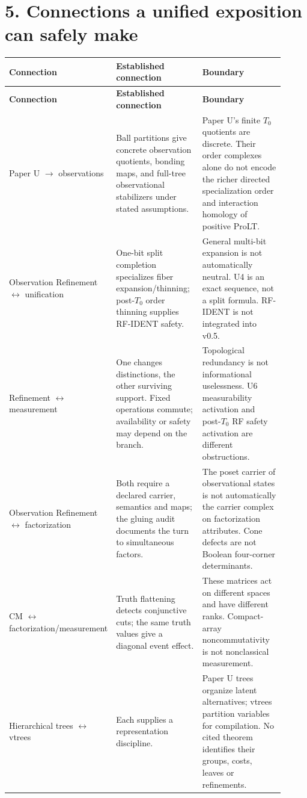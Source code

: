 \documentclass[10pt,letterpaper]{article}
\begin{document}
\section*{5. Connections a unified exposition can safely make}

\begingroup
\footnotesize
\setlength{\tabcolsep}{4pt}
\renewcommand{\arraystretch}{1.12}
\begin{longtable}{@{}P{0.210\linewidth}P{0.348\linewidth}P{0.348\linewidth}@{}}
\hline
\textbf{Connection} & \textbf{Established connection} & \textbf{Boundary} \\ \hline
\endfirsthead
\hline
\textbf{Connection} & \textbf{Established connection} & \textbf{Boundary} \\ \hline
\endhead
Paper U \ensuremath{\to} observations & Ball partitions give concrete observation quotients, bonding maps, and full-tree observational stabilizers under stated assumptions. & Paper U's finite \(T_0\) quotients are discrete. Their order complexes alone do not encode the richer directed specialization order and interaction homology of positive ProLT. \\ \hline
Observation Refinement \ensuremath{\leftrightarrow} unification & One-bit split completion specializes fiber expansion/thinning; post-\(T_0\) order thinning supplies RF-IDENT safety. & General multi-bit expansion is not automatically neutral. U4 is an exact sequence, not a split formula. RF-IDENT is not integrated into v0.5. \\ \hline
Refinement \ensuremath{\leftrightarrow} measurement & One changes distinctions, the other surviving support. Fixed operations commute; availability or safety may depend on the branch. & Topological redundancy is not informational uselessness. U6 measurability activation and post-\(T_0\) RF safety activation are different obstructions. \\ \hline
Observation Refinement \ensuremath{\leftrightarrow} factorization & Both require a declared carrier, semantics and maps; the gluing audit documents the turn to simultaneous factors. & The poset carrier of observational states is not automatically the carrier complex on factorization attributes. Cone defects are not Boolean four-corner determinants. \\ \hline
CM \ensuremath{\leftrightarrow} factorization/measurement & Truth flattening detects conjunctive cuts; the same truth values give a diagonal event effect. & These matrices act on different spaces and have different ranks. Compact-array noncommutativity is not nonclassical measurement. \\ \hline
Hierarchical trees \ensuremath{\leftrightarrow} vtrees & Each supplies a representation discipline. & Paper U trees organize latent alternatives; vtrees partition variables for compilation. No cited theorem identifies their groups, costs, leaves or refinements. \\ \hline
\end{longtable}
\endgroup
\end{document}
